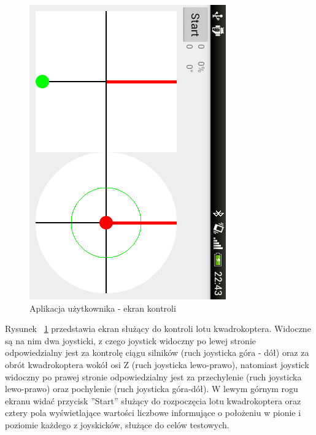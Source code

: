 \begin{figure}[H]
	\centering
	\includegraphics[scale=0.8, angle=90]{Pictures/DroidAtScreen/droid@screen-4.png}
	\caption[Aplikacja użytkownika - ekran kontroli]{Aplikacja użytkownika - ekran kontroli}
	\label{fig:QuadroControl_screen4}
\end{figure}

Rysunek ~\ref{fig:QuadroControl_screen4} przedstawia ekran służący do kontroli lotu kwadrokoptera. Widoczne są na nim dwa joysticki, z czego joystick widoczny po lewej stronie odpowiedzialny jest za kontrolę ciągu silników (ruch joysticka góra - dół) oraz za obrót kwadrokoptera wokół osi Z (ruch joysticka lewo-prawo), natomiast joystick widoczny po prawej stronie odpowiedzialny jest za przechylenie (ruch joysticka lewo-prawo) oraz pochylenie (ruch joysticka góra-dół). W lewym górnym rogu ekranu widać przycisk ''Start'' służący do rozpoczęcia lotu kwadrokoptera oraz cztery pola wyświetlające wartości liczbowe informujące o położeniu w pionie i poziomie każdego z joyskicków, służące do celów testowych.

